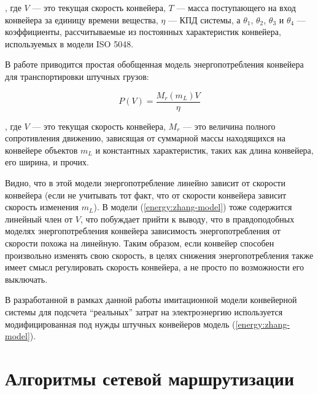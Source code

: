 \documentclass[specification,annotation,times]{itmo-student-thesis}
\theoremstyle{definition}
\newtheorem{definition-ru}{Определение}
\begin{document}
, где $V$ --- это текущая скорость конвейера, $T$ --- масса поступающего на вход
конвейера за единицу времени вещества, $\eta$ --- КПД системы, а $\theta_1$,
$\theta_2$, $\theta_3$ и $\theta_4$ --- коэффициенты, рассчитываемые из
постоянных характеристик конвейера, используемых в модели ISO 5048. 

В работе \cite{halepoto2016design} приводится простая обобщенная модель
энергопотребления конвейера для транспортировки штучных грузов:

\begin{equation}\label{energy:linear-model}
  P(V) = \frac{M_r(m_L)V}{\eta}
\end{equation}

, где $V$ --- это текущая скорость конвейера, $M_r$ --- это величина полного
сопротивления движению, зависящая от суммарной массы находящихся на конвейере
объектов $m_L$ и константных характеристик, таких как длина конвейера, его
ширина, и прочих.

Видно, что в этой модели энергопотребление линейно зависит от
скорости конвейера (если не учитывать тот факт, что от скорости конвейера
зависит скорость изменения $m_L$). В модели (\ref{energy:zhang-model}) тоже содержится
линейный член от $V$, что побуждает прийти к выводу, что в правдоподобных
моделях энергопотребления конвейера зависимость энергопотребления от скорости
похожа на линейную. Таким образом, если конвейер способен произвольно изменять
свою скорость, в целях снижения энергопотребления также имеет смысл регулировать
скорость конвейера, а не просто по возможности его выключать.

В разработанной в рамках данной работы имитационной модели конвейерной системы
для подсчета ``реальных'' затрат на электроэнергию используется модифицированная
под нужды штучных конвейеров модель (\ref{energy:zhang-model}).





\section{Алгоритмы сетевой маршрутизации}\label{overview:networks}
\end{document}
